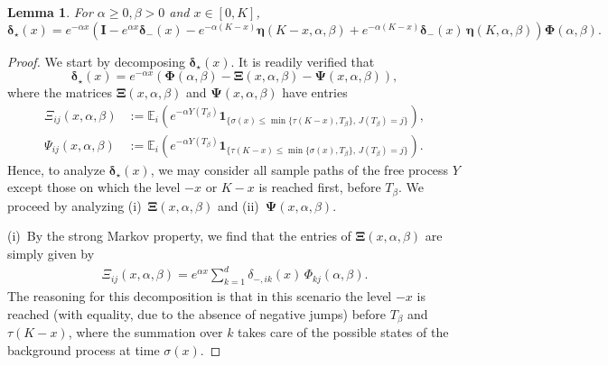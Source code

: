 \documentclass[reqno,12pt]{amsart}
\newcommand{\bs}{\boldsymbol}
\newtheorem{lemma}{Lemma}
\begin{document}
\begin{lemma}\label{lemma: delta*} For $\alpha \geqslant0, \beta>0$ and $x\in[0,K]$,
    \begin{equation}\label{eq: delta*}
        \bs\delta_\star(x) = e^{-\alpha x}\left( \bs{I} - e^{\alpha x}\bs\delta_-(x) - e^{-\alpha(K-x)}\bs\eta(K-x,\alpha,\beta) + e^{-\alpha(K-x)}\bs\delta_-(x)\,\bs\eta(K,\alpha,\beta) \right)\bs\Phi(\alpha,\beta).
    \end{equation}
\end{lemma}
\begin{proof} 
    We start by decomposing $\bs\delta_\star(x)$. It is readily verified that
   \begin{equation}\label{eq: decomp delta*}
       \bs\delta_\star(x) = e^{-\alpha x}\left(\bs\Phi(\alpha,\beta) - {\bs \Xi}(x,\alpha, \beta) -{\bs \Psi}(x,\alpha, \beta)\right),
   \end{equation}
    where the matrices ${\bs \Xi}(x,\alpha,\beta)$ and ${\bs \Psi}(x,\alpha,\beta)$ have entries
\begin{align*}
    \Xi_{ij}(x,\alpha,\beta)&:= {\mathbb E}_i\left(e^{-\alpha Y(T_{\beta})}{\bs 1}_{\{\sigma(x)\leqslant\min\{\tau(K-x), T_{\beta} \},\,J(T_{\beta})=j\}}\right),\\
    \Psi_{ij}(x,\alpha,\beta)&:= {\mathbb E}_i\left(e^{-\alpha Y(T_{\beta})}{\bs 1}_{\{\tau(K-x)\leqslant\min\{\sigma(x), T_{\beta} \},\,J(T_{\beta})=j\}}\right).
\end{align*}Hence, to analyze $\bs\delta_\star(x)$, we may consider all sample paths of the free process $Y$ except those on which the level $-x$ or $K-x$ is reached first, before $T_\beta$. We proceed by analyzing (i)~${\bs \Xi}(x,\alpha,\beta)$ and (ii)~${\bs \Psi}(x,\alpha,\beta)$.

\medskip
(i)~By the strong Markov property, we find that the entries of ${\bs \Xi}(x,\alpha,\beta)$ are simply given by
\begin{align*}
    \Xi_{ij}(x,\alpha,\beta) = e^{\alpha x}\sum_{k=1}^d \delta_{-,ik}(x)\,{\Phi}_{kj}(\alpha, \beta).
\end{align*}
The reasoning for this decomposition is that in this scenario the level $-x$ is reached (with equality, due to the absence of negative jumps) before $T_{\beta}$ and $\tau(K-x)$, where the summation over $k$ takes care of the possible states of the background process at time $\sigma(x)$.


\end{proof}
\end{document}
